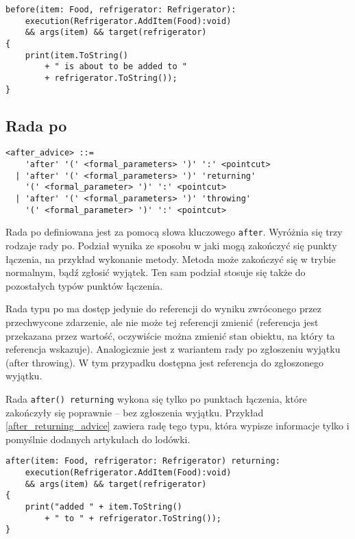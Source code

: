 \documentclass[a4paper,12pt]{mwbk}
\begin{document}
\begin{lstlisting}[style=AspectJ,caption=Rada przed,label=before_advice]
before(item: Food, refrigerator: Refrigerator): 
    execution(Refrigerator.AddItem(Food):void) 
    && args(item) && target(refrigerator) 
{
    print(item.ToString() 
        + " is about to be added to " 
        + refrigerator.ToString());
}
\end{lstlisting}


\subsection{Rada po}

\begin{lstlisting}[style=grammar]
<after_advice> ::= 
    'after' '(' <formal_parameters> ')' ':' <pointcut>
  | 'after' '(' <formal_parameters> ')' 'returning' 
    '(' <formal_parameter> ')' ':' <pointcut>
  | 'after' '(' <formal_parameters> ')' 'throwing' 
    '(' <formal_parameter> ')' ':' <pointcut>
\end{lstlisting}

Rada po definiowana jest za pomocą słowa kluczowego \lstinline!after!. Wyróżnia
się trzy rodzaje rady po. Podział wynika ze sposobu w jaki mogą zakończyć się
punkty łączenia, na przykład wykonanie metody.  Metoda może zakończyć się w
trybie normalnym, bądź zgłosić wyjątek. Ten sam podział stosuje się także do
pozostałych typów punktów łączenia.


Rada typu po ma dostęp jedynie do referencji
do wyniku zwróconego przez przechwycone zdarzenie, ale nie może tej referencji
zmienić (referencja jest przekazana przez wartość, oczywiście można zmienić
stan obiektu, na który ta referencja wskazuje). Analogicznie jest z
wariantem rady po zgłoszeniu wyjątku (after throwing). W tym przypadku
dostępna jest referencja do zgłoszonego wyjątku.

Rada \lstinline!after() returning! wykona się tylko po punktach łączenia, które
zakończyły się poprawnie -- bez zgłoszenia wyjątku. Przykład
\ref{after_returning_advice} zawiera radę tego typu, która wypisze informacje
tylko i pomyślnie dodanych artykułach do lodówki.

\begin{lstlisting}[style=AspectJ,caption=Rada after returning,label=after_returning_advice]
after(item: Food, refrigerator: Refrigerator) returning: 
    execution(Refrigerator.AddItem(Food):void) 
    && args(item) && target(refrigerator) 
{
    print("added " + item.ToString() 
        + " to " + refrigerator.ToString());
}
\end{lstlisting}
\end{document}
